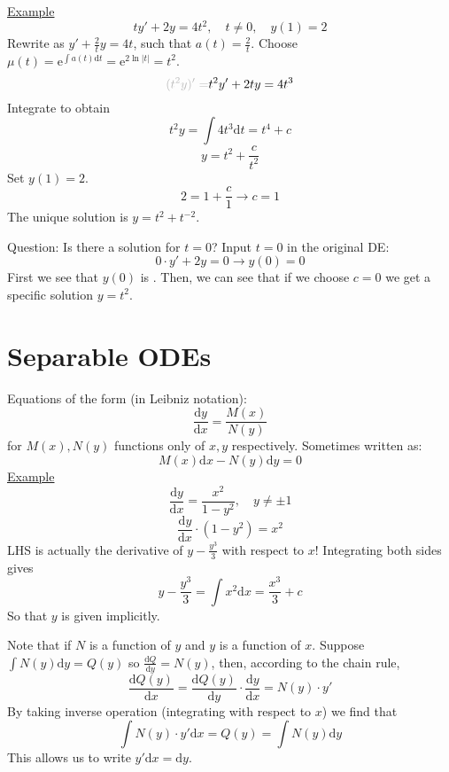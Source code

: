 \documentclass{article}
\newcommand{\mathd}{\mathrm{d}}
\newcommand{\mathe}{\mathrm{e}}
\newcommand{\tmtextit}[1]{\text{{\itshape{#1}}}}
\begin{document}
{\underline{Example}}
\[ ty' + 2 y = 4 t^2, \quad t \neq 0, \quad y (1) = 2 \]
Rewrite as $y' + \frac{2}{t} y = 4 t$, such that $a (t) = \frac{2}{t}$. Choose
$\mu (t) = \mathe^{\int a (t) \mathd t} = \mathe^{2 \ln | t |} = t^2$.
\[ {\color[HTML]{B8B8B8}(t^2 y)' =} t^2 y' + 2 ty = 4 t^3 \]
Integrate to obtain
\[ t^2 y = \int 4 t^3 \mathd t = t^4 + c \]
\[ y = t^2 + \frac{c}{t^2} \]
Set $y (1) = 2$.
\[ 2 = 1 + \frac{c}{1} \rightarrow c = 1 \]
The unique solution is $y = t^2 + t^{- 2}$.

Question: Is there a solution for $t = 0$? Input $t = 0$ in the original DE:
\[ 0 \cdot y' + 2 y = 0 \rightarrow y (0) = 0 \]
First we see that $y (0)$ is \tmtextit{defined}. Then, we can see that if we
choose $c = 0$ we get a specific solution $y = t^2$.

\section{Separable ODEs}

Equations of the form (in Leibniz notation):
\[ \frac{\mathd y}{\mathd x} = \frac{M (x)}{N (y)} \]
for $M (x), N (y)$ functions only of $x, y$ respectively. Sometimes written
as:
\[ M (x) \mathd x - N (y) \mathd y = 0 \]
{\underline{Example}}
\[ \frac{\mathd y}{\mathd x} = \frac{x^2}{1 - y^2}, \quad y \neq \pm 1 \]
\[ \frac{\mathd y}{\mathd x} \cdot (1 - y^2) = x^2 \]
LHS is actually the derivative of $y - \frac{y^3}{3}$ with respect to $x$!
Integrating both sides gives
\[ y - \frac{y^3}{3} = \int x^2 \mathd x = \frac{x^3}{3} + c \]
So that $y$ is given implicitly.

Note that if $N$ is a function of $y$ and $y$ is a
function of $x$. Suppose $\int N (y) \mathd y = Q (y)$ so $\frac{\mathd
Q}{\mathd y} = N (y)$, then, according to the chain rule,
\[ \frac{\mathd Q (y)}{\mathd x} = \frac{\mathd Q (y)}{\mathd y} \cdot
   \frac{\mathd y}{\mathd x} = N (y) \cdot y' \]
By taking inverse operation (integrating with respect to $x$) we find that
\[ \int N (y) \cdot y' \mathd x = Q (y) = \int N (y) \mathd y \]
This allows us to write $y' \mathd x = \mathd y$.
\end{document}
